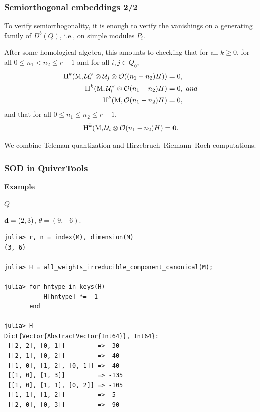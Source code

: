 \documentclass{beamer}
\begin{document}
\begin{frame}
    \frametitle{Semiorthogonal embeddings 2/2}

To verify semiorthogonality, it is enough to verify the vanishings
on a generating family of $D^b(Q)$, i.e., on simple modules $P_i$. \pause

After some homological algebra, this amounts to checking that for all $k \geq 0$,
for all $0 \leq n_1 < n_2 \leq r-1$ and for all $i,j \in Q_0$,
\begin{align}
    \operatorname{H}^k(\operatorname{M}, \mathcal{U}^\vee_i \otimes \mathcal{U}_j \otimes \mathcal{O}((n_1 - n_2)H)) &= 0, \label{equation:needed-UidualUjH}\\
    \operatorname{H}^k(\operatorname{M}, \mathcal{U}^\vee_i \otimes \mathcal{O}(n_1 - n_2)H) &= 0,\ and \label{equation:needed-UidualH}\\
    \operatorname{H}^k(\operatorname{M}, \mathcal{O}(n_1 - n_2)H) &= 0, \label{equation:needed-H}
\end{align}
and that for all $0 \leq n_1 \leq n_2 \leq r-1$,
\begin{equation}
    \operatorname{H}^k(\operatorname{M}, \mathcal{U}_i \otimes \mathcal{O}(n_1 - n_2)H) = 0. \label{equation:needed-UiH}
\end{equation} \pause

We combine Teleman quantization and Hirzebruch--Riemann--Roch computations.
\end{frame}

\begin{frame}[fragile]
    \frametitle{SOD in QuiverTools}
\textbf{Example}
\begin{center}

    $Q = $
    $\mathbf{d} = (2, 3)$, $\theta = (9, -6)$. \pause
\end{center}  
\scriptsize{
\begin{lstlisting}
julia> r, n = index(M), dimension(M)
(3, 6)

julia> H = all_weights_irreducible_component_canonical(M);

julia> for hntype in keys(H)
           H[hntype] *= -1
       end

julia> H
Dict{Vector{AbstractVector{Int64}}, Int64}:
 [[2, 2], [0, 1]]         => -30
 [[2, 1], [0, 2]]         => -40
 [[1, 0], [1, 2], [0, 1]] => -40
 [[1, 0], [1, 3]]         => -135
 [[1, 0], [1, 1], [0, 2]] => -105
 [[1, 1], [1, 2]]         => -5
 [[2, 0], [0, 3]]         => -90
\end{lstlisting}
}
\end{frame}
\end{document}
